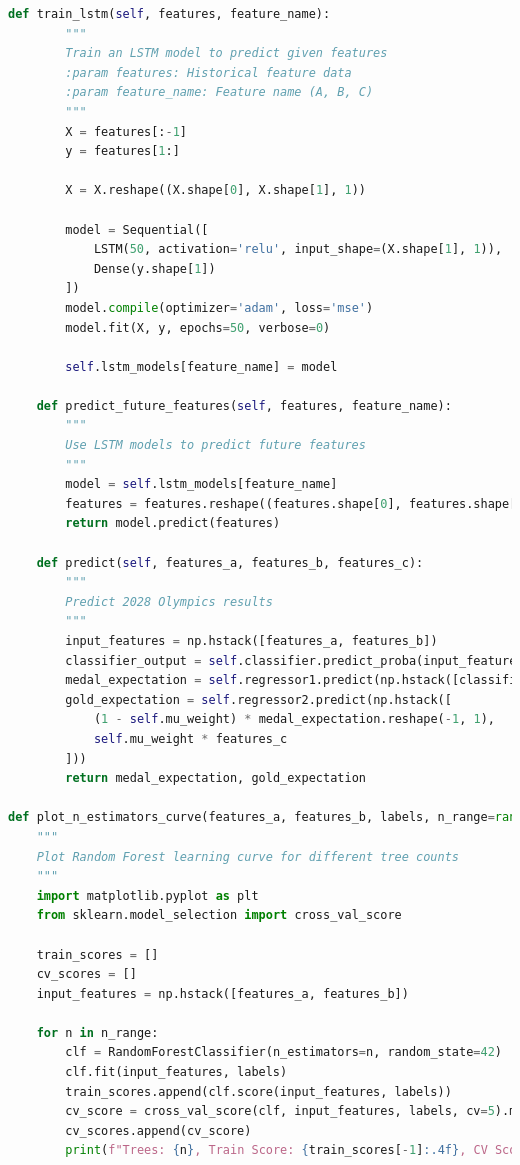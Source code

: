 \documentclass[12pt]{article}
\begin{document}
\begin{lstlisting}[language=Python, style=mystyle, caption=model.ipynb]
    def train_lstm(self, features, feature_name):
        """
        Train an LSTM model to predict given features
        :param features: Historical feature data
        :param feature_name: Feature name (A, B, C)
        """
        X = features[:-1]
        y = features[1:]

        X = X.reshape((X.shape[0], X.shape[1], 1))

        model = Sequential([
            LSTM(50, activation='relu', input_shape=(X.shape[1], 1)),
            Dense(y.shape[1])
        ])
        model.compile(optimizer='adam', loss='mse')
        model.fit(X, y, epochs=50, verbose=0)

        self.lstm_models[feature_name] = model

    def predict_future_features(self, features, feature_name):
        """
        Use LSTM models to predict future features
        """
        model = self.lstm_models[feature_name]
        features = features.reshape((features.shape[0], features.shape[1], 1))
        return model.predict(features)

    def predict(self, features_a, features_b, features_c):
        """
        Predict 2028 Olympics results
        """
        input_features = np.hstack([features_a, features_b])
        classifier_output = self.classifier.predict_proba(input_features)[:, 1]
        medal_expectation = self.regressor1.predict(np.hstack([classifier_output.reshape(-1, 1), features_b]))
        gold_expectation = self.regressor2.predict(np.hstack([
            (1 - self.mu_weight) * medal_expectation.reshape(-1, 1),
            self.mu_weight * features_c
        ]))
        return medal_expectation, gold_expectation

def plot_n_estimators_curve(features_a, features_b, labels, n_range=range(10, 500, 20)):
    """
    Plot Random Forest learning curve for different tree counts
    """
    import matplotlib.pyplot as plt
    from sklearn.model_selection import cross_val_score
    
    train_scores = []
    cv_scores = []
    input_features = np.hstack([features_a, features_b])
    
    for n in n_range:
        clf = RandomForestClassifier(n_estimators=n, random_state=42)
        clf.fit(input_features, labels)
        train_scores.append(clf.score(input_features, labels))
        cv_score = cross_val_score(clf, input_features, labels, cv=5).mean()
        cv_scores.append(cv_score)
        print(f"Trees: {n}, Train Score: {train_scores[-1]:.4f}, CV Score: {cv_scores[-1]:.4f}")
    

\end{lstlisting}
\end{document}
